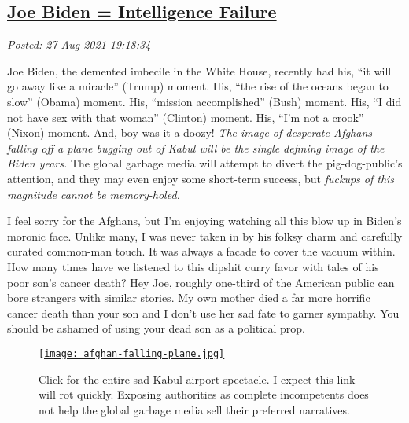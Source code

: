 %

\subsection*{\href{http://analyzethedatanotthedrivel.org/2021/08/27/joe-biden-intelligence-failure/}{Joe Biden = Intelligence Failure}}


\noindent\emph{Posted: 27 Aug 2021 19:18:34}
\vspace{6pt}

Joe Biden, the demented imbecile in the White House, recently had his,
``it will go away like a miracle'' (Trump) moment. His, ``the rise of
the oceans began to slow'' (Obama) moment. His, ``mission accomplished''
(Bush) moment. His, ``I did not have sex with that woman'' (Clinton)
moment. His, ``I'm not a crook'' (Nixon) moment. And, boy was it a
doozy! \emph{The image of desperate Afghans falling off a plane bugging
out of Kabul will be the single defining image of the Biden years.} The
global garbage media will attempt to divert the pig-dog-public's
attention, and they may even enjoy some short-term success, but \emph{fuckups
of this magnitude cannot be memory-holed.}


I feel sorry for the Afghans, but I'm enjoying watching all this blow up
in Biden's moronic face. Unlike many, I was never taken in by his folksy
charm and carefully curated common-man touch. It was always a facade to
cover the vacuum within. How many times have we listened to this dipshit
curry favor with tales of his poor son's cancer death? Hey Joe, roughly
one-third of the American public can bore strangers with similar
stories. My own mother died a far more horrific cancer death than your
son and I don't use her sad fate to garner sympathy. You should be
ashamed of using your dead son as a political prop.

\captionsetup[figure]{labelformat=empty}
\begin{SCfigure}[50]
\centering
\href{https://www.huffpost.com/entry/kabul-airport-video-afghans-clinging-plane_n_611a6142e4b07b9118ad564d}{\texttt{[image: afghan-falling-plane.jpg]}}
\caption[Click for the Kabul airport spectacle]{Click for the entire sad Kabul airport spectacle. I expect this
link will rot quickly. Exposing authorities as complete incompetents
does not help the global garbage media sell their preferred narratives.}
\label{fig:7221x0}
\end{SCfigure}


